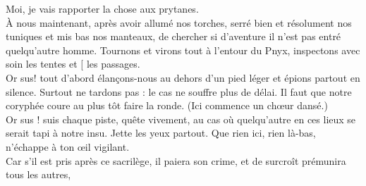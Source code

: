 \documentclass[12pt]{book}%
\newcommand{\passeLigne}[0]{\skipnumbering}%
\newcommand{\fin}[0]{\linebreak\passeLigne\protect\hfill $[$ }%
\newcommand{\espace}[1]{\hspace{#1}}%
\newcommand{\francais}[1]{{\policeFr #1}}%
\newlength{\larg}%
\newlength{\textelargeur}%
\newlength{\texto}%
\newcommand{\personnageFr}[1]{\ledleftnote{%
\settowidth{\texto}{\large{\textbf{Marchande d}}}%
\begin{minipage}{\texto}\begin{flushright}\large{\textbf{#1}}\end{flushright}\end{minipage}}}%
\newcommand{\tetramTrochFr}[1]{%
\hangindent=20pt%
\espace{0pt}%
\francais{#1%
}}%
\newcommand{\tetramAnapFr}[1]{%
\hangindent=20pt%
\espace{0pt}%
\francais{#1%
}}%
\newcommand{\chantChoeurFr}[1]{%
\hangindent=50pt%
\espace{30pt}%
\francais{#1%
}}%
\newenvironment{groupe}{%
\pstart%
\ledgroup%
}{%
\pend %
}%
\begin{document}
\begin{pages}
\begin{Rightside}
\begin{groupe}
{Moi, je vais rapporter la chose aux prytanes.\\\passeLigne}%
\end{groupe}%
\begin{groupe}%
\personnageFr{Chœur}%
\tetramAnapFr{À nous maintenant, après avoir allumé nos torches,
serré bien et résolument nos tuniques et mis bas nos manteaux,
de chercher si d'aventure il n'est pas entré quelqu'autre homme. Tournons et virons
tout à l'entour du Pnyx, inspectons avec soin les tentes et \fin les passages.\\\passeLigne}%
\end{groupe}%
\begin{groupe}%
\tetramTrochFr{Or sus! tout d'abord élançons-nous au dehors d'un pied léger
et épions partout en silence. Surtout ne tardons pas : le cas ne souffre plus de délai.
Il faut que notre coryphée coure au plus tôt faire la ronde.
(Ici commence un chœur dansé.)\\\passeLigne}%
\end{groupe}%
\begin{groupe}%
\chantChoeurFr{Or sus ! suis chaque piste, quête vivement,}%
\end{groupe}%
\begin{groupe}%
\chantChoeurFr{au cas où quelqu'autre en ces lieux}%
\end{groupe}%
\begin{groupe}%
\chantChoeurFr{se serait tapi à notre insu.}%
\end{groupe}%
\begin{groupe}%
\chantChoeurFr{Jette les yeux partout.}%
\end{groupe}%
\begin{groupe}%
\chantChoeurFr{Que rien ici, rien là-bas,}%
\end{groupe}%
\begin{groupe}%
\chantChoeurFr{n'échappe à ton \oe il vigilant.\\\passeLigne}%
\end{groupe}%
\begin{groupe}%
\chantChoeurFr{Car s'il est pris après ce sacrilège,}%
\end{groupe}%
\begin{groupe}%
\chantChoeurFr{il paiera son crime, et de surcroît}%
\end{groupe}%
\begin{groupe}%
\chantChoeurFr{prémunira tous les autres,}%

\end{groupe}
\end{Rightside}
\end{pages}
\end{document}
